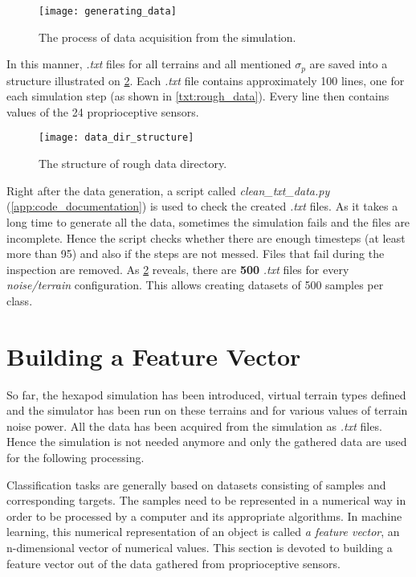 \begin{figure}[H]
  \centering
  \texttt{[image: generating\_data]}
  \caption{The process of data acquisition from the simulation.}
  \label{img:generating_data}
\end{figure}

In this manner, \textit{.txt} files for all terrains and all mentioned $ \sigma_p $ are saved into a structure illustrated on \cref{img:data_dir_structure}. Each \textit{.txt} file contains approximately 100 lines, one for each simulation step (as shown in \cref{txt:rough_data}). Every line then contains values of the 24 proprioceptive sensors.

\begin{figure}[H]
  \centering
  \texttt{[image: data\_dir\_structure]}
  \caption{The structure of rough data directory.}
  \label{img:data_dir_structure}
\end{figure}

Right after the data generation, a script called \textit{clean\_txt\_data.py} (\ref{app:code_documentation}) is used to check the created \textit{.txt} files. As it takes a long time to generate all the data, sometimes the simulation fails and the files are incomplete. Hence the script checks whether there are enough timesteps (at least more than 95) and also if the steps are not messed. Files that fail during the inspection are removed. As \cref{img:data_dir_structure} reveals, there are \textbf{500} \textit{.txt} files for every \textit{noise/terrain} configuration. This allows creating datasets of 500 samples per class.

\section{Building a Feature Vector} \label{sec:feature_vector_compilation}
So far, the hexapod simulation has been introduced, virtual terrain types defined and the simulator has been run on these terrains and for various values of terrain noise power. All the data has been acquired from the simulation as \textit{.txt} files. Hence the simulation is not needed anymore and only the gathered data are used for the following processing.

Classification tasks are generally based on datasets consisting of samples and corresponding targets. The samples need to be represented in a numerical way in order to be processed by a computer and its appropriate algorithms. In machine learning, this numerical representation of an object is called \textit{a feature vector}, an n-dimensional vector of numerical values. This section is devoted to building a feature vector out of the data gathered from proprioceptive sensors.

